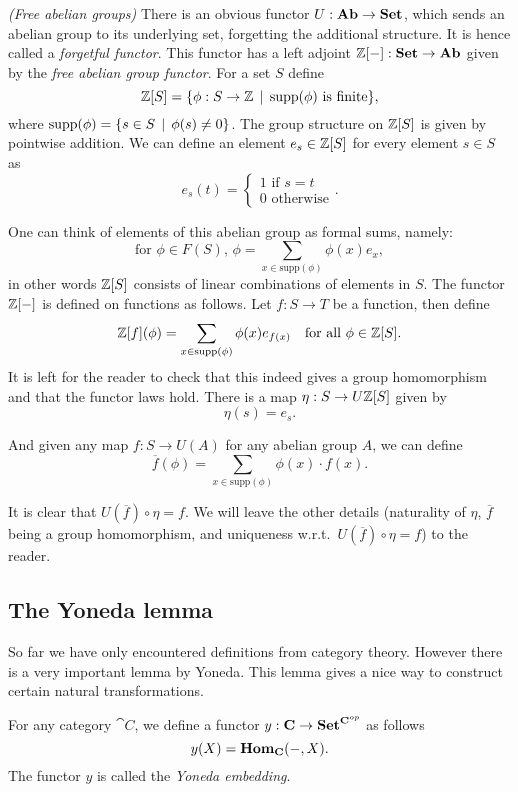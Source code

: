 \begin{example}
	\emph{(Free abelian groups)} There is an obvious functor $U: \mathbf{Ab} \to \mathbf{Set}$, which sends an abelian group to its underlying set, forgetting the additional structure. It is hence called a \emph{forgetful functor}. This functor has a left adjoint $\mathbb{Z}[-]: \mathbf{Set} \to \mathbf{Ab}$  given by the \emph{free abelian group functor}. For a set $S$ define
	$$ \mathbb{Z}[S] = \{ \phi: S \to \mathbb{Z} \,\mid\, \text{supp}(\phi) \text{ is finite}\}, $$
	where $\text{supp}(\phi) = \{ s \in S \,\mid\, \phi(s) \neq 0 \}$. The group structure on $\mathbb{Z}[S]$ is given by pointwise addition. We can define an element $e_s \in \mathbb{Z}[S]$ for every element $s \in S$ as
	$$ e_s(t) =
	\begin{cases}
		1 \text{ if } s = t \\
		0 \text{ otherwise}
	\end{cases}. $$

	One can think of elements of this abelian group as formal sums, namely:
	$$ \text{for } \phi \in F(S),\, \phi = \sum_{x \in \text{supp}(\phi)}\phi(x) e_x, $$
	in other words $\mathbb{Z}[S]$ consists of linear combinations of elements in $S$. The functor $\mathbb{Z}[-]$ is defined on functions as follows. Let $f: S \to T$ be a function, then define
	$$ \mathbb{Z}[f](\phi) = \sum_{x \in \text{supp}(\phi)} \phi(x) e_{f(x)} \quad\text{for all } \phi \in \mathbb{Z}[S]. $$
	It is left for the reader to check that this indeed gives a group homomorphism and that the functor laws hold. There is a map $\eta: S \to U\mathbb{Z}[S]$ given by
	$$ \eta(s) = e_s. $$

	And given any map $f: S \to U(A)$ for any abelian group $A$, we can define
	$$ \overline{f}(\phi) = \sum_{x \in \text{supp}(\phi)} \phi(x) \cdot f(x). $$

	It is clear that $U(\overline{f}) \circ \eta = f$. We will leave the other details (naturality of $\eta$, $\overline{f}$ being a group homomorphism, and uniqueness w.r.t.~$U(\overline{f}) \circ \eta = f$) to the reader.
\end{example}

\subsection{The Yoneda lemma}
So far we have only encountered definitions from category theory. However there is a very important lemma by Yoneda. This lemma gives a nice way to construct certain natural transformations.

\begin{definition}
	For any category $\cat{C}$, we define a functor $y:\mathbf{C} \to \mathbf{Set}^{\mathbf{C}^{op}}$ as follows
	$$ y(X) = \mathbf{Hom}_{\mathbf{C}}(-, X). $$
	The functor $y$ is called the \emph{Yoneda embedding}.
\end{definition}

